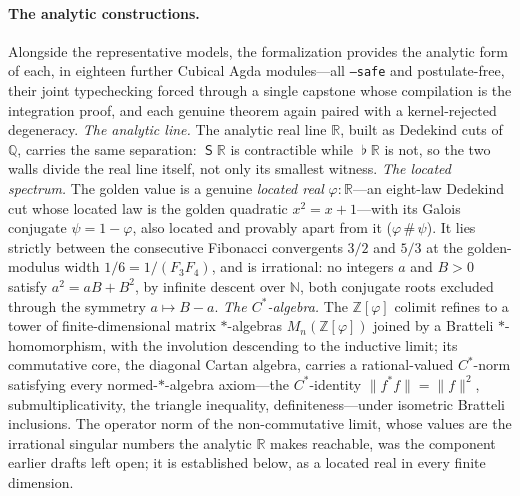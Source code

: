 \documentclass[11pt,letterpaper]{article}
\theoremstyle{plain}
\theoremstyle{definition}
\theoremstyle{remark}
\newcommand{\shapeM}{\mathop{\mathsf{S}}\nolimits}      %
\newcommand{\flatM}{\mathop{\flat}\nolimits}            %
\newcommand{\NN}{\mathbb{N}}
\newcommand{\ZZ}{\mathbb{Z}}
\newcommand{\QQ}{\mathbb{Q}}
\newcommand{\RR}{\mathbb{R}}
\newcommand{\Zphi}{\ZZ[\varphi]}
\begin{document}
\paragraph{The analytic constructions.}
Alongside the representative models, the formalization provides the analytic form of
each, in eighteen further Cubical Agda modules---all \texttt{--safe} and
postulate-free, their joint typechecking forced through a single capstone whose
compilation is the integration proof, and each genuine theorem again paired with a
kernel-rejected degeneracy. \emph{The analytic line.} The analytic real line $\RR$,
built as Dedekind cuts of $\QQ$, carries the same separation: $\shapeM\RR$ is
contractible while $\flatM\RR$ is not, so the two walls divide the real line itself,
not only its smallest witness. \emph{The located spectrum.} The golden value is a
genuine \emph{located real} $\varphi:\RR$---an eight-law Dedekind cut whose located
law is the golden quadratic $x^2 = x+1$---with its Galois conjugate $\psi = 1-\varphi$,
also located and provably apart from it ($\varphi\,\#\,\psi$). It lies strictly
between the consecutive Fibonacci convergents $3/2$ and $5/3$ at the golden-modulus
width $1/6 = 1/(F_3 F_4)$, and is irrational: no integers $a$ and $B>0$ satisfy
$a^2 = aB + B^2$, by infinite descent over $\NN$, both conjugate roots excluded
through the symmetry $a\mapsto B-a$. \emph{The $C^\ast$-algebra.} The $\Zphi$ colimit
refines to a tower of finite-dimensional matrix $\ast$-algebras $M_n(\Zphi)$ joined by
a Bratteli $\ast$-homomorphism, with the involution descending to the inductive
limit; its commutative core, the diagonal Cartan algebra, carries a rational-valued
$C^\ast$-norm satisfying every normed-$\ast$-algebra axiom---the $C^\ast$-identity
$\|f^\ast f\| = \|f\|^2$, submultiplicativity, the triangle inequality,
definiteness---under isometric Bratteli inclusions. The operator norm of the
non-commutative limit, whose values are the irrational singular numbers the analytic
$\RR$ makes reachable, was the component earlier drafts left open; it is established
below, as a located real in every finite dimension.
\end{document}
